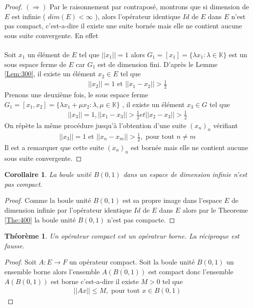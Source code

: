 \documentclass{report}
\newtheorem{The}{Théorème}[subsection]
\newtheorem{Cor}{Corollaire}[subsection]
\begin{document}
{\begin{proof}
 \hbox{$(\Rightarrow)$} Par le raisonnement par contraposé, montrons que si dimension de $E$ est infinie ( $dim(E) < \infty$ ), alors l'opérateur identique $Id$ de $E$ dans $E$ n'est pas compact, c'est-a-dire il existe une suite bornée mais elle ne contient aucune sous suite convergente. En effet \\ \\
 Soit $x_1$ un élément de $E$ tel que $||x_1|| = 1$ alors $G_1 = [x_1] = \{\lambda x_1 : \lambda \in \mathbb{K}\}$ est un sous espace ferme de $E$ car $G_1$ est de dimension fini. D'après le Lemme \ref{Lem:300}, il existe un élément $x_2 \in E$ tel que 
									\begin{align*}
 									 ||x_2|| = 1   \,\,\text{et}\,\,   ||x_1 - x_2|| > \frac{1}{2} 
									\end{align*}
 Prenons une deuxième fois, le sous espace ferme $G_1 = [x_1,x_2] = \{\lambda x_1 + \mu x_2 : \lambda, \mu \in \mathbb{K}\}$ , il existe un élément $x_3 \in G$ tel que 
									\begin{align*}
 									 ||x_3|| = 1 , ||x_1- x_3|| > \frac{1}{2} et ||x_2 - x_3|| > \frac{1}{2} 
									\end{align*}
 On répète la même procédure jusqu'à l'obtention d'une suite $(x_n)_n$ vérifiant 
									\begin{align*}
 									 ||x_3|| = 1 \,\,\text{et}\,\, ||x_n - x_m|| > \frac{1}{2} , \,\,\text{pour tout}\,\, n \neq m 
									\end{align*}
Il est a remarquer que cette suite $(x_n)_n$ est bornée mais elle ne contient aucune sous suite convergente.
\end{proof}


\begin{Cor} La boule unité $B(0, 1)$ dans un espace de dimension infinie n'est pas compact. \\
\end{Cor}
\begin{proof}
Comme la boule unité $B(0, 1)$ est sa propre image dans l'espace $E$ de dimension infinie par l'opérateur identique $Id$ de $E$ dans $E$ alors par le Theoreme \ref{The:400} la boule unité $B(0, 1)$ n'est pas compacte.
\end{proof}


\begin{The} Un opérateur compact est un opérateur borne. La réciproque est fausse.
\end{The}
\begin{proof}
Soit $A: E \rightarrow F$ un opérateur compact. Soit la boule unité $B(0, 1)$ un ensemble borne alors l'ensemble $\overline{A(B(0,1))}$ est compact donc l'ensemble $A(B(0,1))$ est borne c'est-a-dire il existe $M > 0$ tel que 
									\begin{align*}
									 ||A x|| \le M ,    \,\,\text{pour tout}\,\, x \in B(0,1) 
									\end{align*}


\end{proof}}
\end{document}

